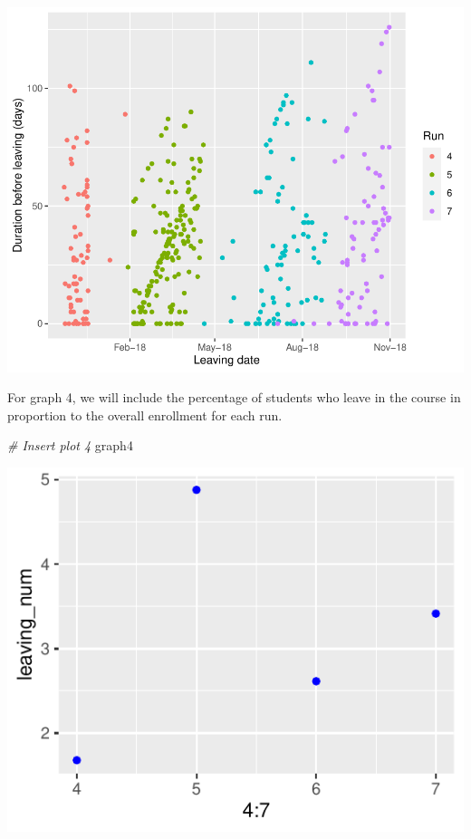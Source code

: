 \documentclass[12pt,]{article}
\newenvironment{Shaded}{\begin{snugshade}}{\end{snugshade}}
\newcommand{\CommentTok}[1]{\textcolor[rgb]{0.56,0.35,0.01}{\textit{#1}}}
\newcommand{\NormalTok}[1]{#1}
\begin{document}
\begin{center}\includegraphics{report_files/figure-latex/unnamed-chunk-5-1} \end{center}

For graph 4, we will include the percentage of students who leave in the
course in proportion to the overall enrollment for each run.

\begin{Shaded}
\begin{Highlighting}[]
\CommentTok{\# Insert plot 4}
\NormalTok{graph4}
\end{Highlighting}
\end{Shaded}

\begin{center}\includegraphics{report_files/figure-latex/unnamed-chunk-6-1} \end{center}
\end{document}
